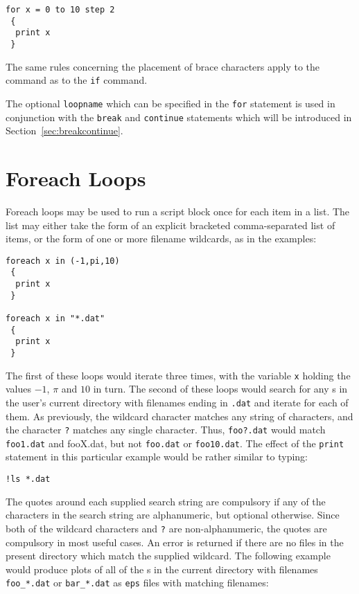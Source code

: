 \begin{verbatim}
for x = 0 to 10 step 2
 {
  print x
 }
\end{verbatim}

The same rules concerning the placement of brace characters apply to the
 command as to the {\tt if} command.

The optional {\tt loopname} which can be specified in the {\tt for} statement
is used in conjunction with the {\tt break} and {\tt continue} statements which
will be introduced in Section~\ref{sec:breakcontinue}.

\section{Foreach Loops}

Foreach loops may be used to run a script block once for each item in a list.
The list may either take the form of an explicit bracketed comma-separated list
of items, or the form of one or more filename wildcards, as in the examples:

\begin{verbatim}
foreach x in (-1,pi,10)
 {
  print x
 }

foreach x in "*.dat"
 {
  print x
 }
\end{verbatim}

The first of these loops would iterate three times, with the variable {\tt x}
holding the values $-1$, $\pi$ and $10$ in turn. The second of these loops
would search for any \datafile s in the user's current directory with filenames
ending in {\tt .dat} and iterate for each of them. As previously, the wildcard
character {\tt *} matches any string of characters, and the character {\tt ?}
matches any single character. Thus, {\tt foo?.dat} would match {\tt foo1.dat}
and {fooX.dat}, but not {\tt foo.dat} or {\tt foo10.dat}. The effect of the
{\tt print} statement in this particular example would be rather similar to
typing:

\begin{verbatim}
!ls *.dat
\end{verbatim}

The quotes around each supplied search string are compulsory if any of the
characters in the search string are alphanumeric, but optional otherwise. Since
both of the wildcard characters {\tt *} and {\tt ?} are non-alphanumeric, the
quotes are compulsory in most useful cases.  An error is returned if there are
no files in the present directory which match the supplied wildcard. The
following example would produce plots of all of the \datafile s in the current
directory with filenames {\tt foo\_*.dat} or {\tt bar\_*.dat} as {\tt eps}
files with matching filenames:

